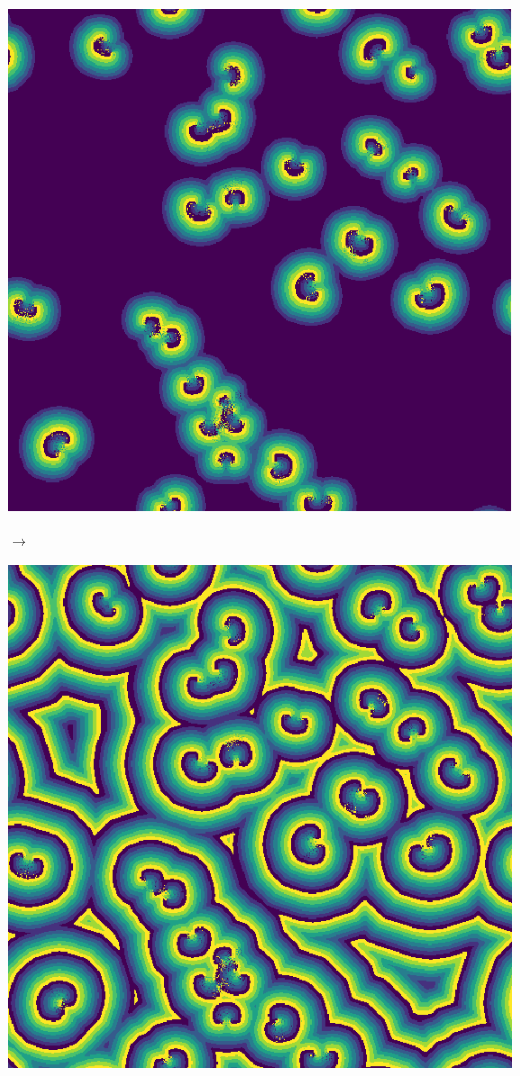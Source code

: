 \documentclass[12pt, a4paper]{article}
\begin{document}
\begin{center}
\begin{minipage}{.17\linewidth}
                    \includegraphics[scale=0.15]{img/part3/1/step2.png}
                \end{minipage}
                $\rightarrow$
                \begin{minipage}{.17\linewidth}
                    \includegraphics[scale=0.15]{img/part3/1/step3.png}

\end{minipage}
\end{center}
\end{document}
